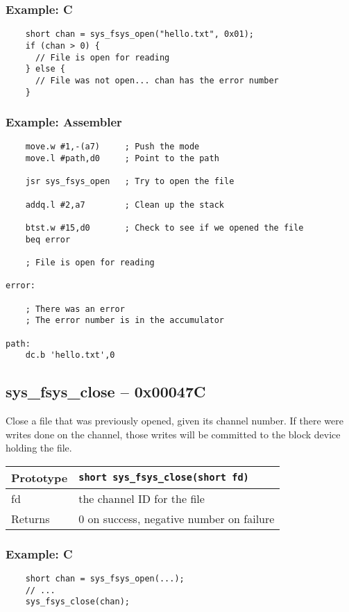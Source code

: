 \subsubsection*{Example: C}
\begin{lstlisting}
    short chan = sys_fsys_open("hello.txt", 0x01);
    if (chan > 0) {
      // File is open for reading
    } else {
      // File was not open... chan has the error number
    }
\end{lstlisting}

\subsubsection*{Example: Assembler}
\begin{verbatim}
	move.w #1,-(a7)     ; Push the mode
	move.l #path,d0     ; Point to the path

    jsr sys_fsys_open   ; Try to open the file

	addq.l #2,a7        ; Clean up the stack

    btst.w #15,d0       ; Check to see if we opened the file
    beq error

    ; File is open for reading

error:

    ; There was an error
    ; The error number is in the accumulator

path:
    dc.b 'hello.txt',0
\end{verbatim}


\subsection*{sys\_fsys\_close -- 0x00047C}
Close a file that was previously opened, given its channel number.
If there were writes done on the channel, those writes will be committed to the block device holding the file.

\bigskip

\begin{tabular}{|l||l|} \hline
Prototype & \lstinline!short sys_fsys_close(short fd)! \\ \hline
fd & the channel ID for the file \\ \hline
Returns & 0 on success, negative number on failure \\ \hline
\end{tabular}

\subsubsection*{Example: C}
\begin{lstlisting}
    short chan = sys_fsys_open(...);
    // ...
    sys_fsys_close(chan);
\end{lstlisting}

